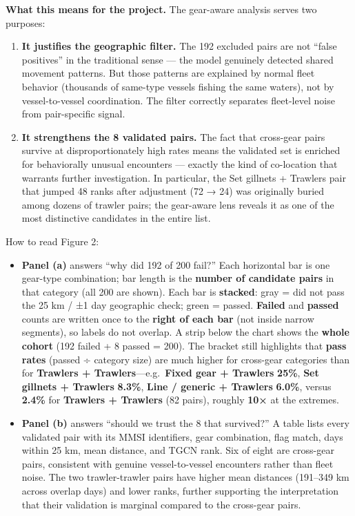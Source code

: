 \documentclass[
]{article}
\providecommand{\tightlist}{%
  \setlength{\itemsep}{0pt}\setlength{\parskip}{0pt}}
\begin{document}
\textbf{What this means for the project.} The gear-aware analysis serves
two purposes:

\begin{enumerate}
\def\labelenumi{\arabic{enumi}.}
\tightlist
\item
  \textbf{It justifies the geographic filter.} The 192 excluded pairs
  are not ``false positives'' in the traditional sense --- the model
  genuinely detected shared movement patterns. But those patterns are
  explained by normal fleet behavior (thousands of same-type vessels
  fishing the same waters), not by vessel-to-vessel coordination. The
  filter correctly separates fleet-level noise from pair-specific
  signal.
\item
  \textbf{It strengthens the 8 validated pairs.} The fact that
  cross-gear pairs survive at disproportionately high rates means the
  validated set is enriched for behaviorally unusual encounters ---
  exactly the kind of co-location that warrants further investigation.
  In particular, the Set gillnets + Trawlers pair that jumped 48 ranks
  after adjustment (72 → 24) was originally buried among dozens of
  trawler pairs; the gear-aware lens reveals it as one of the most
  distinctive candidates in the entire list.
\end{enumerate}

How to read Figure 2:

\begin{itemize}
\tightlist
\item
  \textbf{Panel (a)} answers ``why did 192 of 200 fail?'' Each
  horizontal bar is one gear-type combination; bar length is the
  \textbf{number of candidate pairs} in that category (all 200 are
  shown). Each bar is \textbf{stacked}: gray = did not pass the 25 km /
  ±1 day geographic check; green = passed. \textbf{Failed} and
  \textbf{passed} counts are written once to the \textbf{right of each
  bar} (not inside narrow segments), so labels do not overlap. A strip
  below the chart shows the \textbf{whole cohort} (192 failed + 8 passed
  = 200). The bracket still highlights that \textbf{pass rates} (passed
  ÷ category size) are much higher for cross-gear categories than for
  \textbf{Trawlers + Trawlers}---e.g.~\textbf{Fixed gear + Trawlers}
  \textbf{25\%}, \textbf{Set gillnets + Trawlers} \textbf{8.3\%},
  \textbf{Line / generic + Trawlers} \textbf{6.0\%}, versus
  \textbf{2.4\%} for \textbf{Trawlers + Trawlers} (82 pairs), roughly
  \textbf{10×} at the extremes.
\item
  \textbf{Panel (b)} answers ``should we trust the 8 that survived?'' A
  table lists every validated pair with its MMSI identifiers, gear
  combination, flag match, days within 25 km, mean distance, and TGCN
  rank. Six of eight are cross-gear pairs, consistent with genuine
  vessel-to-vessel encounters rather than fleet noise. The two
  trawler-trawler pairs have higher mean distances (191--349 km across
  overlap days) and lower ranks, further supporting the interpretation
  that their validation is marginal compared to the cross-gear pairs.
\end{itemize}
\end{document}
